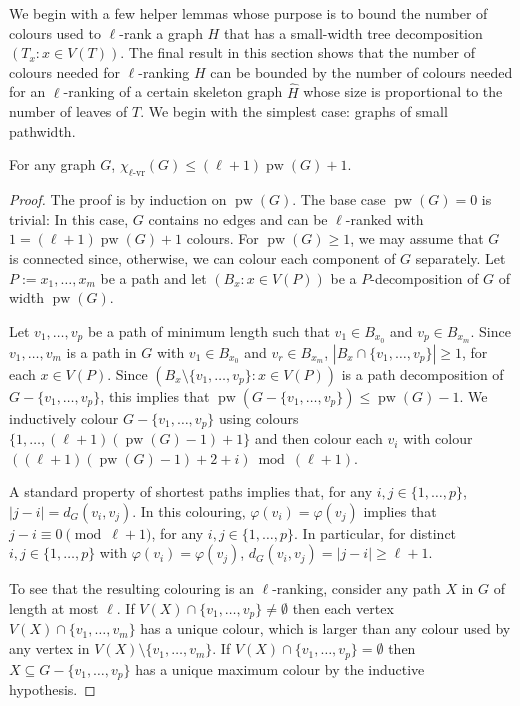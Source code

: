 \documentclass[kpfonts]{patmorin}
\DeclareMathOperator{\pw}{pw}
\newcommand{\rn}[1]{\chi_{\operatorname{#1-vr}}}
\newcommand{\lrn}{\rn{\ell}}
\theoremstyle{named}
\begin{document}
We begin with a few helper lemmas whose purpose is to bound the number of colours used to $\ell$-rank a graph $H$ that has a small-width tree decomposition $(T_x:x\in V(T))$.  The final result in this section shows that the number of colours needed for $\ell$-ranking $H$ can be bounded by the number of colours needed for an $\ell$-ranking of a certain skeleton graph $\hat{H}$ whose size is proportional to the number of leaves of $T$. We begin with the simplest case: graphs of small pathwidth.

\begin{lem}\label{pathwidth}
    For any graph $G$, $\lrn(G)\le (\ell+1)\pw(G) + 1$.
\end{lem}

\begin{proof}
    The proof is by induction on $\pw(G)$.  The base case $\pw(G)=0$ is trivial: In this case, $G$ contains no edges and can be $\ell$-ranked with $1 = (\ell+1)\pw(G)+1$ colours.   For $\pw(G)\ge 1$, we may assume that $G$ is connected since, otherwise, we can colour each component of $G$ separately. Let $P:=x_1,\ldots,x_m$ be a path and let $(B_x:x\in V(P))$ be a $P$-decomposition of $G$ of width $\pw(G)$.

    Let $v_1,\ldots,v_p$ be a path of minimum length such that $v_1\in B_{x_0}$ and $v_p\in B_{x_m}$.  Since $v_1,\ldots,v_m$ is a path in $G$ with $v_1\in B_{x_0}$ and $v_r\in B_{x_m}$,  $|B_x\cap\{v_1,\ldots,v_p\}|\ge 1$, for each $x\in V(P)$.  Since $(B_x\setminus\{v_1,\ldots,v_p\}:x\in V(P))$ is a path decomposition of $G-\{v_1,\ldots,v_p\}$, this implies that $\pw(G-\{v_1,\ldots,v_p\})\le \pw(G)-1$.  We inductively colour $G-\{v_1,\ldots,v_p\}$ using colours $\{1,\ldots,(\ell+1)(\pw(G)-1)+1\}$ and then colour each $v_i$ with colour $((\ell+1)(\pw(G)-1)+2+i)\bmod (\ell+1)$.

    A standard property of shortest paths implies that, for any $i,j\in\{1,\ldots,p\}$, $|j-i|=d_G(v_i,v_j)$. In this colouring, $\varphi(v_i)=\varphi(v_j)$ implies that $j-i\equiv 0\pmod{\ell+1}$, for any $i,j\in\{1,\ldots,p\}$.  In particular, for distinct $i,j\in\{1,\ldots,p\}$ with $\varphi(v_i)=\varphi(v_j)$, $d_G(v_i,v_j) = |j-i|\ge\ell+1$.

    To see that the resulting colouring is an $\ell$-ranking, consider any path $X$ in $G$ of length at most $\ell$. If $V(X)\cap\{v_1,\ldots,v_p\}\neq\emptyset$ then each vertex $V(X)\cap\{v_1,\ldots,v_m\}$ has a unique colour, which is larger than any colour used by any vertex in $V(X)\setminus\{v_1,\ldots,v_m\}$.  If $V(X)\cap\{v_1,\ldots,v_p\}=\emptyset$ then $X\subseteq G-\{v_1,\ldots,v_p\}$ has a unique maximum colour by the inductive hypothesis.
\end{proof}
\end{document}
